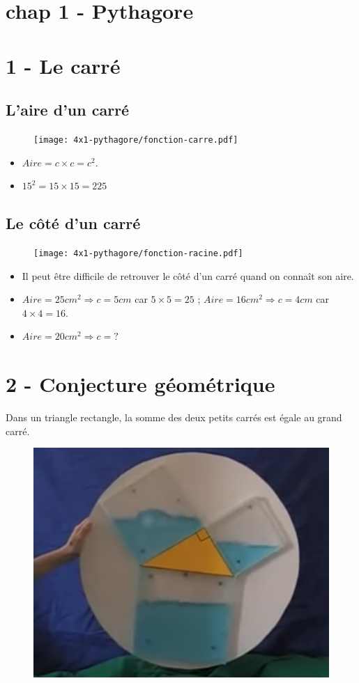 



\section*{chap 1 - Pythagore}

\section*{1 - Le carré}

\begin{multicols}{2}

\subsection*{L'aire d'un carré}

  \begin{figure}[H]
    \centering
    \texttt{[image: 4x1-pythagore/fonction-carre.pdf]}
  \end{figure}

\begin{itemize}
\item $Aire = c \times c = c^2$. 
\item $15^2 = 15 \times 15 = 225$
\end{itemize}

\subsection*{Le côté d'un carré}

  \begin{figure}[H]
    \centering
    \texttt{[image: 4x1-pythagore/fonction-racine.pdf]}
  \end{figure}

\begin{itemize}
\item Il peut être difficile de retrouver le côté d'un carré quand on connaît son aire. 
\item $Aire = 25cm^2 \Rightarrow c = 5cm$ car $5 \times 5 = 25$ ;  $Aire = 16cm^2 \Rightarrow c = 4cm$ car $4 \times 4 = 16$.
\item $Aire = 20cm^2 \Rightarrow c = ?$
\end{itemize}

\end{multicols}

\section*{2 - Conjecture géométrique}

Dans un triangle rectangle, la somme des deux petits carrés est égale au grand carré.

  \begin{figure}[H]
    \centering
    \includegraphics[width=0.4\linewidth]{4x1-pythagore/pyth.png}
  \end{figure}




